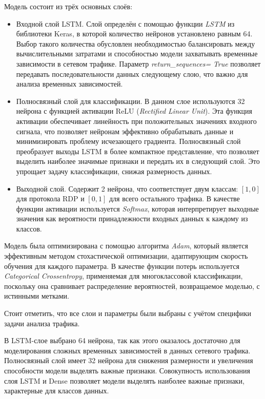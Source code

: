 \documentclass[bachelor, och, coursework]{SCWorks}
\begin{document}
Модель состоит из трёх основных слоёв:
\begin{itemize}
    \item Входной слой LSTM. Слой определён с помощью функции \textit{LSTM} из библиотеки Keras, в которой количество нейронов 
    установлено равным 64. Выбор такого количества обусловлен необходимостью балансировать между вычислительными затратами и способностью 
    модели захватывать временные зависимости в сетевом трафике. Параметр \textit{return\_sequences=} \textit{True} позволяет передавать последовательности 
    данных следующему слою, что важно для анализа временных зависимостей.
    
    \item Полносвязный слой для классификации. В данном слое используются 32 нейрона с функцией активации ReLU (\textit{Rectified Linear Unit}). 
    Эта функция активации обеспечивает линейность при положительных значениях входного сигнала, что позволяет нейронам эффективно обрабатывать данные и 
    минимизировать проблему исчезающего градиента. Полносвязный слой преобразует выходы LSTM в более компактное представление, что позволяет выделить 
    наиболее значимые признаки и передать их в следующий слой. Это упрощает задачу классификации, снижая размерность данных.
    
    \item Выходной слой. Содержит 2 нейрона, что соответствует двум классам: \([1, 0]\) для протокола RDP и \([0, 1]\) для всего остального 
    трафика. В качестве функции активации используется \textit{Softmax}, которая интерпретирует выходные значения как вероятности принадлежности входных 
    данных к каждому из классов.
\end{itemize}

Модель была оптимизирована с помощью алгоритма \textit{Adam}, который является эффективным методом стохастической оптимизации, адаптирующим скорость 
обучения для каждого параметра. В качестве функции потерь используется \textit{Categorical Crossentropy}, применяемая для многоклассовой классификации, 
поскольку она сравнивает распределение вероятностей, возвращаемое моделью, с истинными метками.

Стоит отметить, что все слои и параметры были выбраны с учётом специфики задачи анализа трафика.

В LSTM-слое выбрано 64 нейрона, так как этого оказалось достаточно для моделирования сложных временных зависимостей в данных сетевого трафика. Полносвязный 
слой имеет 32 нейрона для снижения размерности и увеличения способности модели выделять важные признаки. Совокупность использования слоя LSTM и Dense 
позволяет модели выделять наиболее важные признаки, характерные для классов данных.
\end{document}
